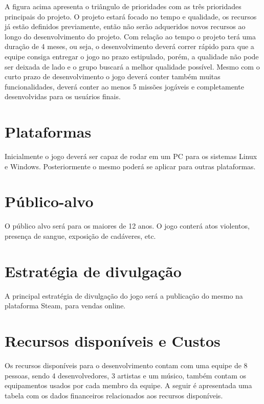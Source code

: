 \documentclass[11pt]{article} %
\begin{document}
A figura acima apresenta o triângulo de prioridades com as três prioridades principais do projeto. O projeto estará focado no tempo e qualidade, os recursos já estão definidos previamente, então não serão adqueridos novos recursos ao longo do desenvolvimento do projeto. Com relação ao tempo o projeto terá uma duração de 4 meses, ou seja, o desenvolvimento deverá correr rápido para que a equipe consiga entregar o jogo no prazo estipulado, porém, a qualidade não pode ser deixada de lado e o grupo buscará a melhor qualidade possível. 
Mesmo com o curto prazo de desenvolvimento o jogo deverá conter também muitas funcionalidades, deverá conter ao menos 5 missões jogáveis e completamente desenvolvidas para os usuários finais.

\section{Plataformas}

Inicialmente o jogo deverá ser capaz de rodar em um PC para os sistemas Linux e Windows. Posteriormente o mesmo poderá se aplicar para outras plataformas.

\section{Público-alvo}

O público alvo será para os maiores de 12 anos. O jogo conterá atos violentos, presença de sangue, exposição de cadáveres, etc.

\section{Estratégia de divulgação}

A principal estratégia de divulgação do jogo será a publicação do mesmo na plataforma Steam, para vendas online.

\section{Recursos disponíveis e Custos}

Os recursos disponíveis para o desenvolvimento contam com uma equipe de 8 pessoas, sendo 4 desenvolvedores, 3 artistas e um músico, também contam os equipamentos usados por cada membro da equipe. A seguir é apresentada uma tabela com os dados financeiros relacionados aos recursos disponíveis.
\end{document}

